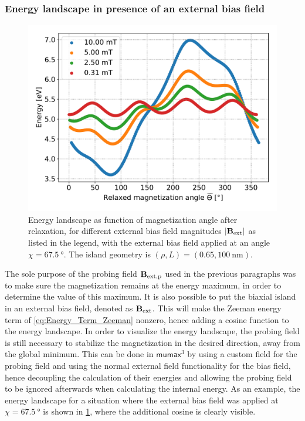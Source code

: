 \documentclass[11pt,a4paper,english,twoside]{article}
\newcommand{\mumax}{$\mathsf{mumax}^3$}
\begin{document}
\subsubsection{Energy landscape in presence of an external bias field}
\begin{figure}[b!]
    \centering
    \includegraphics[width=0.7\columnwidth]{Figures/biaxial_island/BarrierLandscape/Ext_K0.1Ms2_Bext1e-2-1e-4_a3Pi8.pdf}
    \caption{Energy landscape as function of magnetization angle after relaxation, for different external bias field magnitudes $\abs{\vb{B_\mathrm{ext}}}$ as listed in the legend, with the external bias field applied at an angle $\chi=\SI{67.5}{\degree}$. The island geometry is $(\rho,L)=(0.65,\SI{100}{\nano\metre})$.}
    \label{fig:barrierLandscape_extField}
\end{figure}
The sole purpose of the probing field $\vb{B_\mathrm{ext,p}}$ used in the previous paragraphs was to make sure the magnetization remains at the energy maximum, in order to determine the value of this maximum. It is also possible to put the biaxial island in an external bias field, denoted as $\vb{B_\mathrm{ext}}$. This will make the Zeeman energy term of \cref{eq:Energy_Term_Zeeman} nonzero, hence adding a cosine function to the energy landscape. In order to visualize the energy landscape, the probing field is still necessary to stabilize the magnetization in the desired direction, away from the global minimum. This can be done in \mumax{} by using a custom field for the probing field and using the normal external field functionality for the bias field, hence decoupling the calculation of their energies and allowing the probing field to be ignored afterwards when calculating the internal energy. As an example, the energy landscape for a situation where the external bias field was applied at $\chi=\SI{67.5}{\degree}$ is shown in \cref{fig:barrierLandscape_extField}, where the additional cosine is clearly visible.
\end{document}
